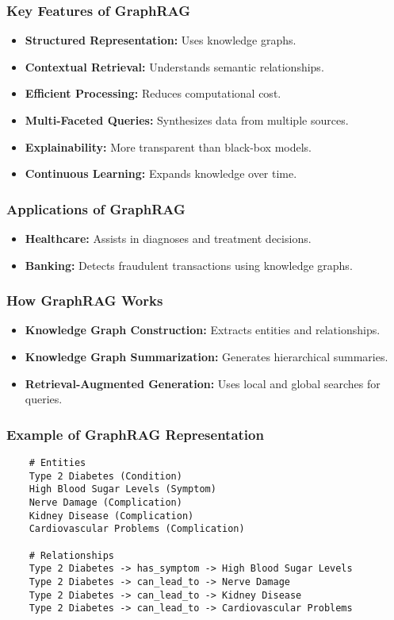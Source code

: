 \begin{frame}[fragile]\frametitle{Key Features of GraphRAG}
    \begin{itemize}
        \item \textbf{Structured Representation:} Uses knowledge graphs.
        \item \textbf{Contextual Retrieval:} Understands semantic relationships.
        \item \textbf{Efficient Processing:} Reduces computational cost.
        \item \textbf{Multi-Faceted Queries:} Synthesizes data from multiple sources.
        \item \textbf{Explainability:} More transparent than black-box models.
        \item \textbf{Continuous Learning:} Expands knowledge over time.
    \end{itemize}
\end{frame}

\begin{frame}[fragile]\frametitle{Applications of GraphRAG}
    \begin{itemize}
        \item \textbf{Healthcare:} Assists in diagnoses and treatment decisions.
        \item \textbf{Banking:} Detects fraudulent transactions using knowledge graphs.
    \end{itemize}
\end{frame}

\begin{frame}[fragile]\frametitle{How GraphRAG Works}
    \begin{itemize}
        \item \textbf{Knowledge Graph Construction:} Extracts entities and relationships.
        \item \textbf{Knowledge Graph Summarization:} Generates hierarchical summaries.
        \item \textbf{Retrieval-Augmented Generation:} Uses local and global searches for queries.
    \end{itemize}
\end{frame}

\begin{frame}[fragile]\frametitle{Example of GraphRAG Representation}
    \begin{lstlisting}
    # Entities
    Type 2 Diabetes (Condition)
    High Blood Sugar Levels (Symptom)
    Nerve Damage (Complication)
    Kidney Disease (Complication)
    Cardiovascular Problems (Complication)

    # Relationships
    Type 2 Diabetes -> has_symptom -> High Blood Sugar Levels
    Type 2 Diabetes -> can_lead_to -> Nerve Damage
    Type 2 Diabetes -> can_lead_to -> Kidney Disease
    Type 2 Diabetes -> can_lead_to -> Cardiovascular Problems
    \end{lstlisting}
\end{frame}


